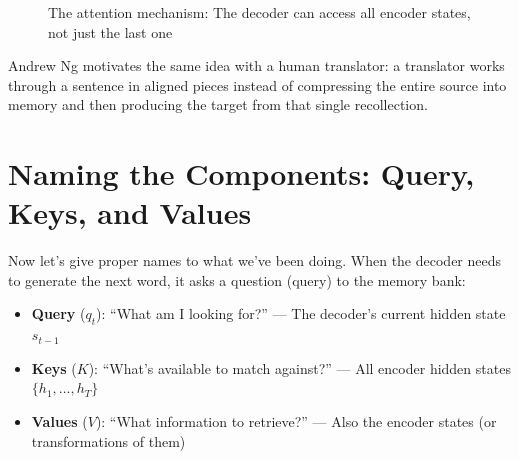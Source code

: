 \documentclass{article}
\begin{document}
\begin{figure}[h]
\centering
{}
\caption{The attention mechanism: The decoder can access all encoder states, not just the last one}
\end{figure}

Andrew Ng motivates the same idea with a human translator: a translator works through
a sentence in aligned pieces instead of compressing the entire source into memory and
then producing the target from that single recollection.

\section{Naming the Components: Query, Keys, and Values}

Now let's give proper names to what we've been doing. When the decoder needs to generate the next word, it asks a question (query) to the memory bank:

\begin{itemize}
    \item \textbf{Query} ($q_t$): ``What am I looking for?'' — The decoder's current hidden state $s_{t-1}$
    \item \textbf{Keys} ($K$): ``What's available to match against?'' — All encoder hidden states $\{h_1, ..., h_T\}$
    \item \textbf{Values} ($V$): ``What information to retrieve?'' — Also the encoder states (or transformations of them)
\end{itemize}
\end{document}
